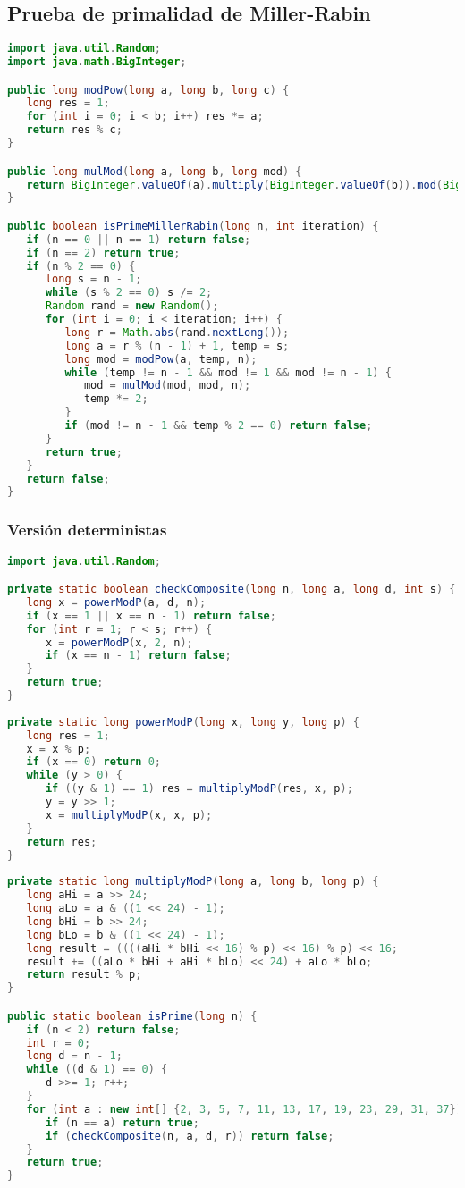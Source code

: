 \subsection{Prueba de primalidad de Miller-Rabin}
\begin{lstlisting}[language=Java]
import java.util.Random;
import java.math.BigInteger;

public long modPow(long a, long b, long c) {
   long res = 1;
   for (int i = 0; i < b; i++) res *= a;
   return res % c;
}

public long mulMod(long a, long b, long mod) {
   return BigInteger.valueOf(a).multiply(BigInteger.valueOf(b)).mod(BigInteger.valueOf(mod)).longValue();
}

public boolean isPrimeMillerRabin(long n, int iteration) {
   if (n == 0 || n == 1) return false;
   if (n == 2) return true;
   if (n % 2 == 0) {
      long s = n - 1;
      while (s % 2 == 0) s /= 2;
      Random rand = new Random();
      for (int i = 0; i < iteration; i++) {
         long r = Math.abs(rand.nextLong());
         long a = r % (n - 1) + 1, temp = s;
         long mod = modPow(a, temp, n);
         while (temp != n - 1 && mod != 1 && mod != n - 1) {
            mod = mulMod(mod, mod, n);
            temp *= 2;
         }
         if (mod != n - 1 && temp % 2 == 0) return false;
      }
      return true;
   }
   return false;
}
\end{lstlisting} 

\subsubsection{Versión deterministas}
\begin{lstlisting}[language=Java]
import java.util.Random;

private static boolean checkComposite(long n, long a, long d, int s) {
   long x = powerModP(a, d, n);
   if (x == 1 || x == n - 1) return false;
   for (int r = 1; r < s; r++) {
      x = powerModP(x, 2, n);
      if (x == n - 1) return false;
   }
   return true;
}
	
private static long powerModP(long x, long y, long p) {
   long res = 1;
   x = x % p;
   if (x == 0) return 0;
   while (y > 0) {
      if ((y & 1) == 1) res = multiplyModP(res, x, p);
      y = y >> 1;
      x = multiplyModP(x, x, p);
   }
   return res;
}
	
private static long multiplyModP(long a, long b, long p) {
   long aHi = a >> 24;
   long aLo = a & ((1 << 24) - 1);
   long bHi = b >> 24;
   long bLo = b & ((1 << 24) - 1);
   long result = ((((aHi * bHi << 16) % p) << 16) % p) << 16;
   result += ((aLo * bHi + aHi * bLo) << 24) + aLo * bLo;
   return result % p;
}

public static boolean isPrime(long n) {
   if (n < 2) return false;
   int r = 0;
   long d = n - 1;
   while ((d & 1) == 0) {
      d >>= 1; r++;
   }
   for (int a : new int[] {2, 3, 5, 7, 11, 13, 17, 19, 23, 29, 31, 37}) {
      if (n == a) return true;
      if (checkComposite(n, a, d, r)) return false;
   }
   return true;
}
\end{lstlisting} 
